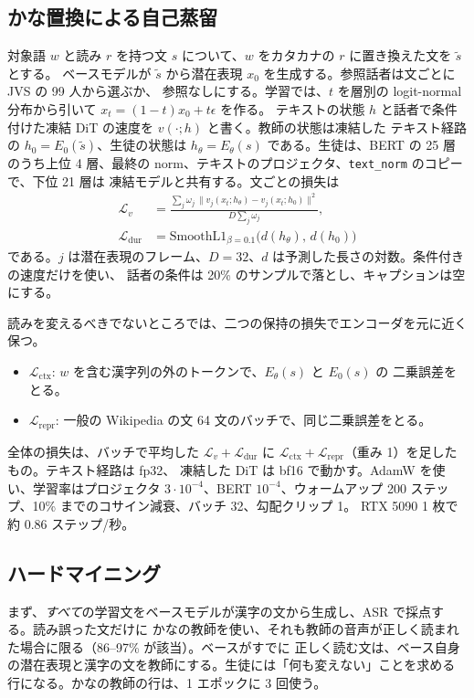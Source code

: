 \documentclass[10pt,a4paper,twocolumn]{article}
\begin{document}
\subsection{かな置換による自己蒸留}
対象語 $w$ と読み $r$ を持つ文 $s$ について、$w$ をカタカナの $r$ に置き換えた文を $\tilde s$ とする。
ベースモデルが $\tilde s$ から潜在表現 $x_0$ を生成する。参照話者は文ごとに JVS の 99 人から選ぶか、
参照なしにする。学習では、$t$ を層別の logit-normal 分布から引いて $x_t=(1-t)x_0+t\epsilon$ を作る。
テキストの状態 $h$ と話者で条件付けた凍結 DiT の速度を $v(\cdot;h)$ と書く。教師の状態は凍結した
テキスト経路の $h_0=E_0(\tilde s)$、生徒の状態は $h_\theta=E_\theta(s)$ である。生徒は、BERT の
25 層のうち上位 4 層、最終の norm、テキストのプロジェクタ、\texttt{text\_norm} のコピーで、下位 21 層は
凍結モデルと共有する。文ごとの損失は
\begin{align}
\mathcal{L}_v &= \frac{\sum_j \omega_j\,\lVert v_j(x_t;h_\theta)-v_j(x_t;h_0)\rVert^2}{D\sum_j\omega_j},\\
\mathcal{L}_{\mathrm{dur}} &= \mathrm{SmoothL1}_{\beta=0.1}\bigl(d(h_\theta),\,d(h_0)\bigr)
\end{align}
である。$j$ は潜在表現のフレーム、$D=32$、$d$ は予測した長さの対数。条件付きの速度だけを使い、
話者の条件は 20\% のサンプルで落とし、キャプションは空にする。

読みを変えるべきでないところでは、二つの保持の損失でエンコーダを元に近く保つ。
\begin{itemize}
\item $\mathcal{L}_{\mathrm{ctx}}$: $w$ を含む漢字列の外のトークンで、$E_\theta(s)$ と $E_0(s)$ の
  二乗誤差をとる。
\item $\mathcal{L}_{\mathrm{repr}}$: 一般の Wikipedia の文 64 文のバッチで、同じ二乗誤差をとる。
\end{itemize}
全体の損失は、バッチで平均した $\mathcal{L}_v+\mathcal{L}_{\mathrm{dur}}$ に
$\mathcal{L}_{\mathrm{ctx}}+\mathcal{L}_{\mathrm{repr}}$（重み 1）を足したもの。テキスト経路は fp32、
凍結した DiT は bf16 で動かす。AdamW を使い、学習率はプロジェクタ $3\cdot10^{-4}$、BERT
$10^{-4}$、ウォームアップ 200 ステップ、10\% までのコサイン減衰、バッチ 32、勾配クリップ 1。
RTX 5090 1 枚で約 0.86 ステップ/秒。

\subsection{ハードマイニング}
まず、\emph{すべて}の学習文をベースモデルが漢字の文から生成し、ASR で採点する。読み誤った文だけに
かなの教師を使い、それも教師の音声が正しく読まれた場合に限る（86--97\% が該当）。ベースがすでに
正しく読む文は、ベース自身の潜在表現と漢字の文を教師にする。生徒には「何も変えない」ことを求める
行になる。かなの教師の行は、1 エポックに 3 回使う。
\end{document}
